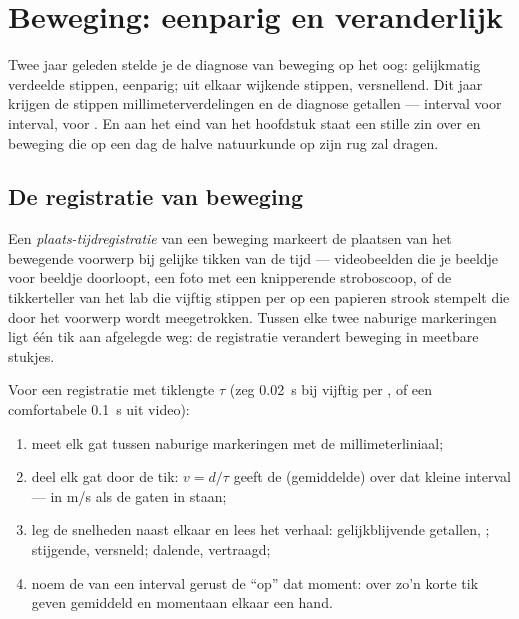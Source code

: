 \chapter{Beweging: eenparig en veranderlijk}\label{ch:g9:uniform-varied-motion}

Twee jaar geleden stelde je de diagnose van beweging op het oog:
gelijkmatig verdeelde stippen, eenparig; uit elkaar wijkende stippen,
versnellend. Dit jaar krijgen de stippen millimeterverdelingen en de
diagnose getallen --- interval voor interval,  voor
. En aan het eind van het hoofdstuk staat een stille
zin over  en beweging die op een dag de halve
natuurkunde op zijn rug zal dragen.

\section{De registratie van beweging}

\begin{definition}\label{def:g9:uniform-varied-motion:record}
Een \emph{plaats-tijdregistratie} van
een beweging markeert de plaatsen van het bewegende voorwerp bij
gelijke tikken van de tijd --- videobeelden die je beeldje voor beeldje
doorloopt, een foto met een knipperende stroboscoop, of de tikkerteller
van het lab die vijftig stippen per  op een papieren strook
stempelt die door het voorwerp wordt meegetrokken. Tussen elke twee
naburige markeringen ligt één tik aan afgelegde weg: de registratie
verandert beweging in meetbare stukjes.
\end{definition}

\begin{method}\label{met:g9:uniform-varied-motion:read}
Voor een registratie met tiklengte $\tau$ (zeg \qty{0.02}{s} bij
vijftig per , of een comfortabele \qty{0.1}{s} uit video):
\begin{enumerate}
  \item meet elk gat tussen naburige markeringen met de
        millimeterliniaal;
  \item deel elk gat door de tik: $v = d/\tau$ geeft de (gemiddelde)
         over dat kleine interval --- in \unit{m/s} als
        de gaten in  staan;
  \item leg de snelheden naast elkaar en lees het verhaal:
        gelijkblijvende getallen, ; stijgende,
        versneld; dalende, vertraagd;
  \item noem de  van een interval gerust de
         ``op'' dat moment: over zo'n korte tik geven
        gemiddeld en momentaan elkaar een hand.
\end{enumerate}
\end{method}

